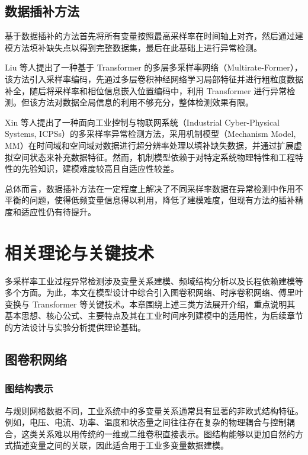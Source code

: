 \documentclass[bachelor, vlined]{DissertUESTC}
\begin{document}
    \subsection{数据插补方法}

    基于数据插补的方法首先将所有变量按照最高采样率在时间轴上对齐，然后通过建模方法填补缺失点以得到完整数据集，最后在此基础上进行异常检测。

    Liu 等人提出了一种基于 Transformer 的多层多采样率网络（Multirate-Former），该方法引入采样率编码，先通过多层卷积神经网络学习局部特征并进行粗粒度数据补全，随后将采样率和相位信息嵌入位置编码中，利用 Transformer 进行异常检测。但该方法对数据全局信息的利用不够充分，整体检测效果有限。
    
    Xin 等人提出了一种面向工业控制与物联网系统（Industrial Cyber-Physical Systems, ICPSs）的多采样率异常检测方法，采用机制模型（Mechanism Model, MM）在时间域和空间域对数据进行超分辨率处理以填补缺失数据，并通过扩展虚拟空间状态来补充数据特征。然而，机制模型依赖于对特定系统物理特性和工程特性的先验知识，建模难度较高且自适应性较差。
    
    总体而言，数据插补方法在一定程度上解决了不同采样率数据在异常检测中作用不平衡的问题，使得低频变量信息得以利用，降低了建模难度，但现有方法的插补精度和适应性仍有待提升。

    \section{相关理论与关键技术}

    多采样率工业过程异常检测涉及变量关系建模、频域结构分析以及长程依赖建模等多个方面。为此，本文在模型设计中综合引入图卷积网络、时序卷积网络、傅里叶变换与 Transformer 等关键技术。本章围绕上述三类方法展开介绍，重点说明其基本思想、核心公式、主要特点及其在工业时间序列建模中的适用性，为后续章节的方法设计与实验分析提供理论基础。

    \subsection{图卷积网络}
    
    \subsubsection{图结构表示}
    
    与规则网格数据不同，工业系统中的多变量关系通常具有显著的非欧式结构特征。例如，电压、电流、功率、温度和状态量之间往往存在复杂的物理耦合与控制耦合，这类关系难以用传统的一维或二维卷积直接表示。图结构能够以更加自然的方式描述变量之间的关联，因此适合用于工业多变量数据建模。
    
\end{document}
